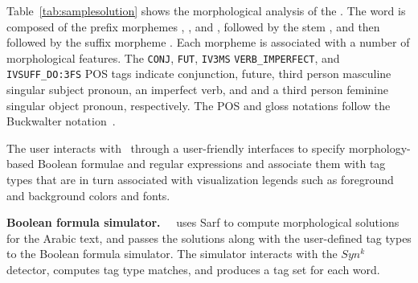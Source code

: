 Table~\ref{tab:samplesolution} shows the morphological analysis
of the . 
The word is composed of the prefix morphemes 
, , and , followed by the 
stem , and then followed by the suffix morpheme
. 
Each morpheme is associated with a number of morphological features.
The {\tt CONJ},
{\tt FUT}, 
{\tt IV3MS} 
{\tt VERB\_IMPERFECT}, and 
{\tt IVSUFF\_DO:3FS} POS tags indicate
conjunction, 
future, 
third person masculine singular subject pronoun,
an imperfect verb, and 
and a third person feminine singular object pronoun, respectively.
The POS and gloss notations follow the Buckwalter notation~\cite{Buckwalter:02}.





The user interacts with \framework~through a user-friendly interfaces to 
specify morphology-based Boolean formulae and regular expressions 
and associate them with tag types that are in turn associated with
visualization legends such as 
foreground and background colors and fonts. 

{\bf Boolean formula simulator.~}
\framework~uses Sarf to compute morphological solutions for the Arabic text, 
and passes the solutions along with the user-defined tag types to the 
Boolean formula simulator.
The simulator interacts with the $Syn^k$ detector, 
computes tag type matches, and produces a tag set for each word. 

